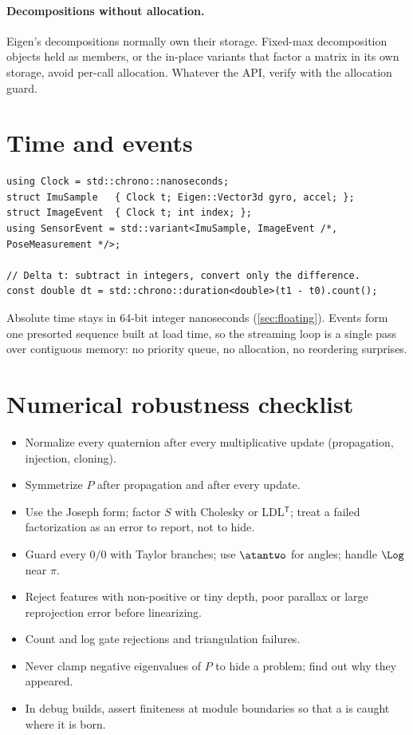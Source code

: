 \paragraph{Decompositions without allocation.} Eigen's decompositions normally own their storage. Fixed-max decomposition objects held as
members, or the in-place variants that factor a matrix in its own storage, avoid per-call allocation. Whatever the API, verify with the
allocation guard.

\section{Time and events}

\begin{lstlisting}
using Clock = std::chrono::nanoseconds;
struct ImuSample   { Clock t; Eigen::Vector3d gyro, accel; };
struct ImageEvent  { Clock t; int index; };
using SensorEvent = std::variant<ImuSample, ImageEvent /*, PoseMeasurement */>;

// Delta t: subtract in integers, convert only the difference.
const double dt = std::chrono::duration<double>(t1 - t0).count();
\end{lstlisting}

Absolute time stays in 64-bit integer nanoseconds (\cref{sec:floating}). Events form one presorted sequence built at load time, so the
streaming loop is a single pass over contiguous memory: no priority queue, no allocation, no reordering surprises.

\section{Numerical robustness checklist}

\begin{itemize}
  \item Normalize every quaternion after every multiplicative update (propagation, injection, cloning).
  \item Symmetrize $P$ after propagation and after every update.
  \item Use the Joseph form; factor $S$ with Cholesky or LDL$^\mathsf{T}$; treat a failed factorization as an error to report, not to hide.
  \item Guard every $0/0$ with Taylor branches; use $\atantwo$ for angles; handle $\Log$ near $\pi$.
  \item Reject features with non-positive or tiny depth, poor parallax or large reprojection error before linearizing.
  \item Count and log gate rejections and triangulation failures.
  \item Never clamp negative eigenvalues of $P$ to hide a problem; find out why they appeared.
  \item In debug builds, assert finiteness at module boundaries so that a  is caught where it is born.
\end{itemize}


